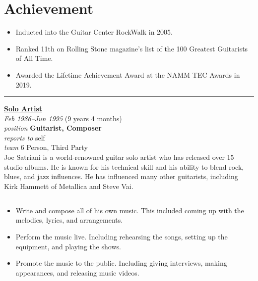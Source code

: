 \documentclass[12pt]{../templates/classes/res}
\begin{document}
\begin{resume}
\begin{minipage}[t]{0.42\linewidth}
  \section{Achievement}
  \begin{flushleft}
        \footnotesize{\begin{itemize}
\item Inducted into the Guitar Center RockWalk in 2005.
\item Ranked 11th on Rolling Stone magazine's list of the 100 Greatest Guitarists of All Time.
\item Awarded the Lifetime Achievement Award at the NAMM TEC Awards in 2019.
\end{itemize}}
  \end{flushleft}
\end{minipage}

\vspace{10pt}
\rule{1.0\textwidth}{0.1pt}
\begin{multicols}{2}
  {\large {\bf \href{https://www.joesatrianiuniverse.com/}{Solo Artist}}} \\
  {\footnotesize{\sl Feb 1986--Jun 1995} \hfill (9 years 4 months)}\\
  {\footnotesize{\sl position} \hfill \bf{Guitarist, Composer}}\\
  {\footnotesize{\sl reports to} \hfill self}\\
  {\footnotesize{\sl team} \hfill 6 Person, Third Party}\\

  \columnbreak
  {\footnotesize{Joe Satriani is a world-renowned guitar solo artist who has released over 15 studio albums. He is known for his technical skill and his ability to blend rock, blues, and jazz influences. He has influenced many other guitarists, including Kirk Hammett of Metallica and Steve Vai.}}\\
\end{multicols}
\vspace{-20pt}

\begin{multicols}{2}
  \section{}
    \begin{itemize}
      \item Write and compose all of his own music. This included coming up with the melodies, lyrics, and arrangements.
\item Perform the music live. Including rehearsing the songs, setting up the equipment, and playing the shows.
\item Promote the music to the public. Including giving interviews, making appearances, and releasing music videos.
    \end{itemize}

\end{multicols}
\end{resume}
\end{document}
